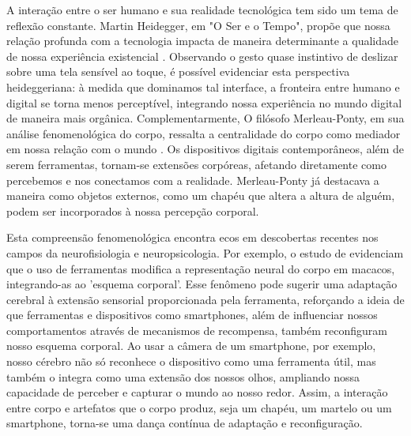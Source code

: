 A interação entre o ser humano e sua realidade tecnológica tem sido um tema de reflexão constante. Martin Heidegger, em "O Ser e o Tempo", propõe que nossa relação profunda com a tecnologia impacta de maneira determinante a qualidade de nossa experiência existencial  \cite{2012_Silva_DISSERTATION}. Observando o gesto quase instintivo de deslizar sobre uma tela sensível ao toque, é possível evidenciar esta perspectiva heideggeriana: à medida que dominamos tal interface, a fronteira entre humano e digital se torna menos perceptível, integrando nossa experiência no mundo digital de maneira mais orgânica. Complementarmente, O filósofo Merleau-Ponty, em sua análise fenomenológica do corpo, ressalta a centralidade do corpo como mediador em nossa relação com o mundo \cite{2011_MerleauPonty_BOOK}. Os dispositivos digitais contemporâneos, além de serem ferramentas, tornam-se extensões corpóreas, afetando diretamente como percebemos e nos conectamos com a realidade. Merleau-Ponty já destacava a maneira como objetos externos, como um chapéu que altera a altura de alguém, podem ser incorporados à nossa percepção corporal.

Esta compreensão fenomenológica encontra ecos em descobertas recentes nos campos da neurofisiologia e neuropsicologia. Por exemplo, o estudo de  evidenciam que o uso de ferramentas modifica a representação neural do corpo em macacos, integrando-as ao 'esquema corporal'. Esse fenômeno pode sugerir uma adaptação cerebral à extensão sensorial proporcionada pela ferramenta, reforçando a ideia de que ferramentas e dispositivos como smartphones, além de influenciar nossos comportamentos através de mecanismos de recompensa, também reconfiguram nosso esquema corporal. Ao usar a câmera de um smartphone, por exemplo, nosso cérebro não só reconhece o dispositivo como uma ferramenta útil, mas também o integra como uma extensão dos nossos olhos, ampliando nossa capacidade de perceber e capturar o mundo ao nosso redor. Assim, a interação entre corpo e artefatos que o corpo produz, seja um chapéu, um martelo ou um smartphone, torna-se uma dança contínua de adaptação e reconfiguração.

